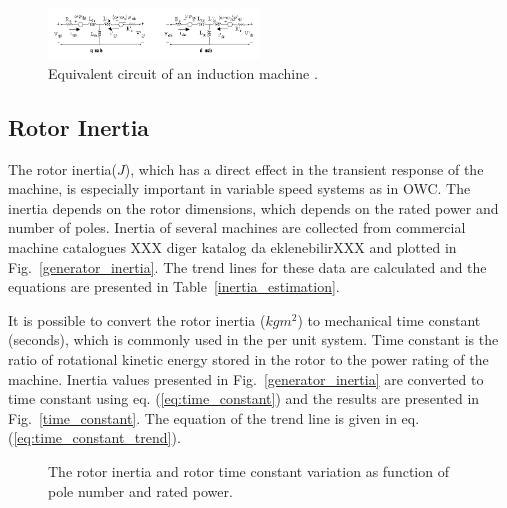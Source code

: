 \documentclass[twocolumn]{article}
\begin{document}
  \begin{figure}
    \centering
    \includegraphics[width=0.5\textwidth]{scig_schematic}
    \caption{Equivalent circuit of an induction machine \cite{Matlab}.} 
    \label{equivalent_circuit}
  \end{figure}
  
\subsection*{Rotor Inertia}

The rotor inertia($J$), which has a direct effect in the transient response of the machine, is especially important in variable speed systems as in OWC. The inertia depends on the rotor dimensions, which depends on the rated power and number of poles. Inertia of several machines are collected from commercial machine catalogues \cite{Siemens2012} XXX diger katalog da eklenebilirXXX and plotted in Fig.~\ref{generator_inertia}. The trend lines for these data are calculated and the equations are presented in Table~\ref{inertia_estimation}.

It is possible to convert the rotor inertia ($kgm^2$) to mechanical time constant (seconds), which is commonly used in the per unit system.  Time constant is the ratio of rotational kinetic energy stored in the rotor to the power rating of the machine. Inertia values presented in Fig.~\ref{generator_inertia} are converted to time constant using eq. (\ref{eq:time_constant}) and the results are presented in Fig.~\ref{time_constant}. The equation of the trend line is given in eq. (\ref{eq:time_constant_trend}).


\begin{figure}[]
  \centering

    \caption{The rotor inertia and rotor time constant variation as function of pole number and rated power.} 
    \label{inertia_timeconstant}
\end{figure}
\end{document}
